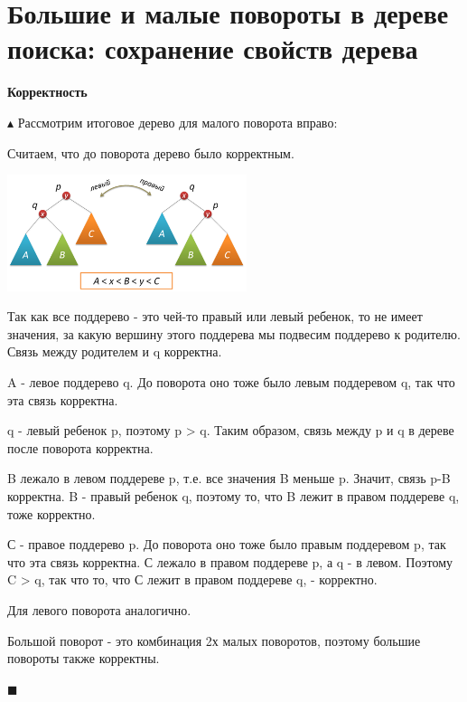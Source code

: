 \section{Большие и малые повороты в дереве поиска: сохранение свойств дерева}

\textbf{Корректность}

$\blacktriangle$ 
Рассмотрим итоговое дерево для малого поворота вправо:

Считаем, что до поворота дерево было корректным.

\includegraphics[width = 7cm]{images/40-42_smallrotate.png}

Так как все поддерево - это чей-то правый или левый ребенок, то не имеет значения, за какую вершину этого поддерева мы подвесим поддерево к родителю. Связь между родителем и q корректна.

A - левое поддерево q. До поворота оно тоже было левым поддеревом q, так что эта связь корректна.

q - левый ребенок p, поэтому p > q. Таким образом, связь между p и q в дереве после поворота корректна.

B  лежало в левом поддереве p, т.е. все значения B  меньше p. Значит, связь p-B корректна. B - правый ребенок q, поэтому то, что B лежит в правом поддереве q, тоже корректно.

С - правое поддерево p. До поворота оно тоже было правым поддеревом p, так что эта связь корректна. С лежало в правом поддереве p, а q - в левом. Поэтому C > q, так что то, что С лежит в правом поддереве q,  - корректно.

Для левого поворота аналогично.

Большой поворот - это комбинация 2х малых поворотов, поэтому большие повороты также корректны.

$\blacksquare$ 